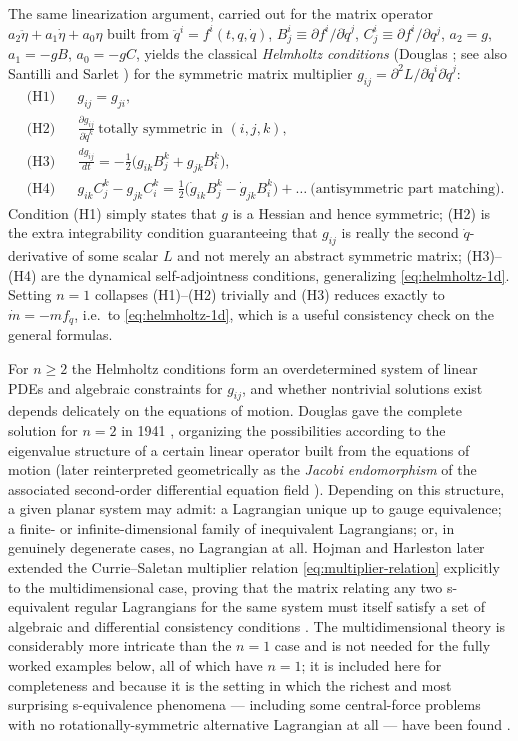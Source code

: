 \documentclass[11pt]{article}
\theoremstyle{remark}
\begin{document}
The same linearization argument, carried out for the matrix operator $a_2\ddot\eta+a_1\dot\eta+a_0\eta$ built from $\ddot q^i=f^i(t,q,\dot q)$, $B^i_j\equiv\partial f^i/\partial \dot q^j$, $C^i_j\equiv\partial f^i/\partial q^j$, $a_2=g$, $a_1=-gB$, $a_0=-gC$, yields the classical \emph{Helmholtz conditions} (Douglas \cite{Douglas1941}; see also Santilli \cite{Santilli1978} and Sarlet \cite{Sarlet1982}) for the symmetric matrix multiplier $g_{ij}=\partial^2 L/\partial \dot q^i\partial\dot q^j$:
\begin{align}
&\text{(H1)} && g_{ij}=g_{ji}, \label{eq:H1}\\
&\text{(H2)} && \frac{\partial g_{ij}}{\partial \dot q^k} \ \text{totally symmetric in } (i,j,k), \label{eq:H2}\\
&\text{(H3)} && \frac{d g_{ij}}{dt} = -\tfrac12\Big(g_{ik}B^k_j+g_{jk}B^k_i\Big), \label{eq:H3}\\
&\text{(H4)} && g_{ik}C^k_j - g_{jk}C^k_i = \tfrac12\Big(\dot g_{ik}B^k_j-\dot g_{jk}B^k_i\Big)+\ldots \ \text{(antisymmetric part matching)} . \label{eq:H4}
\end{align}
Condition (H1) simply states that $g$ is a Hessian and hence symmetric; (H2) is the extra integrability condition guaranteeing that $g_{ij}$ is really the second $\dot q$-derivative of some scalar $L$ and not merely an abstract symmetric matrix; (H3)--(H4) are the dynamical self-adjointness conditions, generalizing \eqref{eq:helmholtz-1d}. Setting $n=1$ collapses (H1)--(H2) trivially and (H3) reduces exactly to $\dot m = -mf_{\dot q}$, i.e.\ to \eqref{eq:helmholtz-1d}, which is a useful consistency check on the general formulas.

For $n\geq 2$ the Helmholtz conditions form an overdetermined system of linear PDEs and algebraic constraints for $g_{ij}$, and whether nontrivial solutions exist depends delicately on the equations of motion. Douglas gave the complete solution for $n=2$ in 1941 \cite{Douglas1941}, organizing the possibilities according to the eigenvalue structure of a certain linear operator built from the equations of motion (later reinterpreted geometrically as the \emph{Jacobi endomorphism} of the associated second-order differential equation field \cite{CramplinSarlet1994}). Depending on this structure, a given planar system may admit: a Lagrangian unique up to gauge equivalence; a finite- or infinite-dimensional family of inequivalent Lagrangians; or, in genuinely degenerate cases, no Lagrangian at all. Hojman and Harleston later extended the Currie--Saletan multiplier relation \eqref{eq:multiplier-relation} explicitly to the multidimensional case, proving that the matrix relating any two s-equivalent regular Lagrangians for the same system must itself satisfy a set of algebraic and differential consistency conditions \cite{HojmanHarleston1981,HojmanUrrutia1981}. The multidimensional theory is considerably more intricate than the $n=1$ case and is not needed for the fully worked examples below, all of which have $n=1$; it is included here for completeness and because it is the setting in which the richest and most surprising s-equivalence phenomena --- including some central-force problems with no rotationally-symmetric alternative Lagrangian at all --- have been found \cite{HenneauxShepley1982}.
\end{document}
